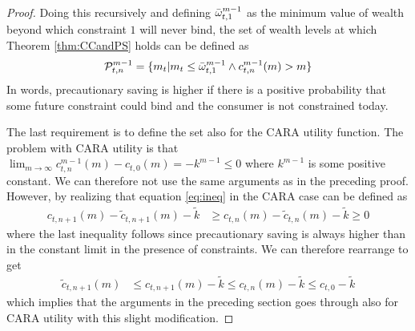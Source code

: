 \documentclass[titlepage]{\econtex}
\newcommand{\ifVerbatimWrite}{\ifthenelse{\boolean{verbatimwriteOn}}} %
\renewenvironment{verbatimwrite}[1]{} %
\providecommand{\wAlt}{\omega}
\begin{document}
\begin{verbatimwrite}{./Sections/Proofs}
\begin{proof}
    
    Doing this recursively and defining $\bar{\wAlt}_{t,1}^{m-1}$ as the minimum value of wealth beyond which constraint $1$ will never bind, the set of wealth levels at which Theorem \ref{thm:CCandPS} holds can be defined as
    \[\mathcal{P}_{t,n}^{m-1} = \{{m}_{t} | {m}_{t} \leq \bar{\wAlt}_{t,1}^{m-1} \wedge c_{t,n}^{m-1}({m}) > {m} \}\]
    In words, precautionary saving is higher if there is a positive probability that some future constraint could bind and the consumer is not constrained today. 
    
    The last requirement is to define the set also for the CARA utility function. The problem with CARA utility is that $\lim_{{m}\rightarrow \infty} c_{t,n}^{m-1}({m}) - c_{t,0}({m}) = - k^{m-1} \leq 0$ where $k^{m-1}$ is some positive constant. We can therefore not use the same arguments as in the preceding proof. However, by realizing that equation \eqref{eq:ineq} in the CARA case can be defined as
    \begin{align*}
      c_{t,n+1}({m}) - \tilde{c}_{t,n+1}({m}) - \tilde{k} &\geq c_{t,n}({m})-\tilde{c}_{t,n}({m}) -  \tilde{k} \geq 0 
    \end{align*}
    where the last inequality follows since precautionary saving is always higher than in the constant limit in the presence of constraints. We can therefore rearrange to get
    \begin{align*}
      \tilde{c}_{t,n+1}({m})  &\leq c_{t,n+1}({m}) - \tilde{k} \leq c_{t,n}({m}) - \tilde{k} \leq c_{t,0} - \tilde{k}	\end{align*}
    which implies that the arguments in the preceding section goes through also for CARA utility with this slight modification. 
    
  \end{proof}

\end{verbatimwrite}\ifVerbatimWrite{}{} %


\clearpage\pagebreak\vfill\eject


\end{document}

